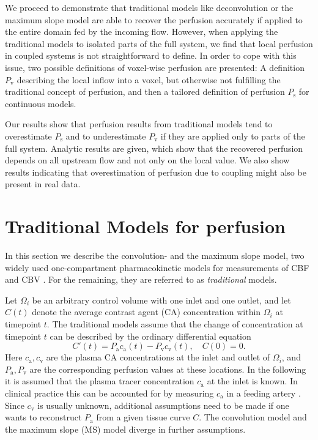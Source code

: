 \documentclass[journal,twocolumn]{IEEEtran}
\newcommand{\ca}{c_\mathrm{a}}
\newcommand{\cout}{c_{\mathrm{v}}}
\newcommand{\Pa}{P_{\mathrm{a}}}
\newcommand{\Pout}{P_{\mathrm{v}}}
\newcommand{\Perfv}{P_{\mathrm{v}}}
\newcommand{\Perfs}{P_{\mathrm{s}}}
\begin{document}
	We proceed to demonstrate that traditional models like deconvolution or the maximum slope model are able to recover the perfusion accurately if applied to the entire domain fed by the incoming flow.
	However, when applying the traditional models to isolated parts of the full system, we find that local perfusion in coupled systems is not straightforward to define.
	In order to cope with this issue, two possible definitions of voxel-wise perfusion are presented: A definition $\Perfv$ describing the local inflow into a voxel, but otherwise not fulfilling the traditional concept of perfusion, and then a tailored definition of perfusion $\Perfs$ for continuous models.
	
	Our results show that perfusion results from traditional models tend to overestimate $\Perfs$ and to underestimate $\Perfv$ if they are applied only to parts of the full system.
	Analytic results are given, which show that the recovered perfusion depends on all upstream flow and not only on the local value.
	We also show results indicating that overestimation of perfusion due to coupling might also be present in real data.
	
	
	\section{Traditional Models for perfusion} \label{sec:traditional}

	In this section we describe the convolution- and the maximum slope model, two widely used one-compartment pharmacokinetic models for measurements of CBF and CBV \cite{Feng2013,Chen2011,kudo10}.
	For the remaining, they are referred to as \emph{traditional} models.
	
	Let $\Omega_i$ be an arbitrary control volume with one inlet and one outlet, and let $C(t)$ denote the average contrast agent (CA) concentration within $\Omega_i$ at timepoint $t$.
	The traditional models assume that the change of concentration at timepoint $t$ can be described by the ordinary differential equation 
	\begin{equation}\label{eq:classicgeneral}
		C'(t) = \Pa\ca(t) - \Pout\cout(t), \quad C(0) = 0.
	\end{equation}
	Here $\ca,\cout$ are the plasma CA concentrations at the inlet and outlet of $\Omega_i$, and $\Pa,\Pout$ are the corresponding perfusion values at these locations.
	In the following it is assumed that the plasma tracer concentration $\ca$ at the inlet is known.
	In clinical practice this can be accounted for by measuring $\ca$ in a feeding artery \cite{ostergaard96}.
	Since $\cout$ is usually unknown, additional assumptions need to be made if one wants to reconstruct $\Pa$ from a given tissue curve $C$. The convolution model and the maximum slope (MS) model diverge in further assumptions.
	
\end{document}
